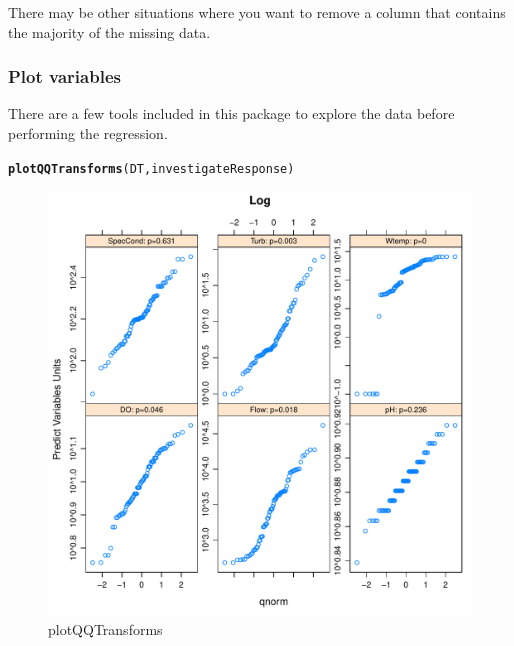 \documentclass[a4paper,11pt]{article}\usepackage[]{graphicx}\usepackage[]{color}
\makeatletter
\def\maxwidth{ %
  \ifdim\Gin@nat@width>\linewidth
    \linewidth
  \else
    \Gin@nat@width
  \fi
}
\newcommand{\hlstd}[1]{\textcolor[rgb]{0.345,0.345,0.345}{#1}}%
\newcommand{\hlkwd}[1]{\textcolor[rgb]{0.737,0.353,0.396}{\textbf{#1}}}%
\newenvironment{kframe}{%
 \def\at@end@of@kframe{}%
 \ifinner\ifhmode%
  \def\at@end@of@kframe{\end{minipage}}%
  \begin{minipage}{\columnwidth}%
 \fi\fi%
 \def\FrameCommand##1{\hskip\@totalleftmargin \hskip-\fboxsep
 \colorbox{shadecolor}{##1}\hskip-\fboxsep
     \hskip-\linewidth \hskip-\@totalleftmargin \hskip\columnwidth}%
 \MakeFramed {\advance\hsize-\width
   \@totalleftmargin\z@ \linewidth\hsize
   \@setminipage}}%
 {\par\unskip\endMakeFramed%
 \at@end@of@kframe}
\newenvironment{knitrout}{}{} %
\makeatother
\begin{document}
There may be other situations where you want to remove a column that contains the majority of the missing data.

\subsubsection{Plot variables}
There are a few tools included in this package to explore the data before performing the regression.

\begin{knitrout}
\color{fgcolor}\begin{kframe}
\begin{alltt}
\hlkwd{plotQQTransforms}\hlstd{(DT,investigateResponse)}
\end{alltt}
\end{kframe}\begin{figure}[]

\includegraphics[width=\maxwidth]{figure/plotQQTransforms1} \caption[plotQQTransforms]{plotQQTransforms\label{fig:plotQQTransforms1}}
\end{figure}

\begin{figure}[]


\end{figure}
\end{knitrout}
\end{document}
